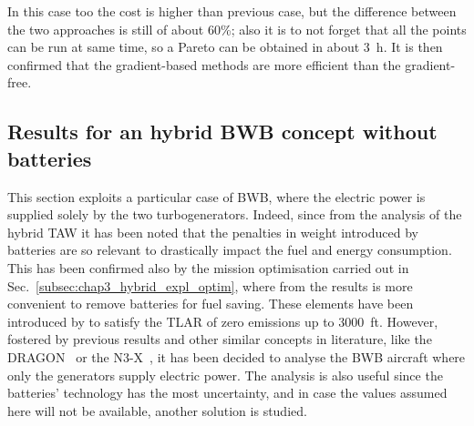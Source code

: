 In this case too the cost is higher than previous case, but the difference between the two approaches is still of about 60\%; also it is to not forget that all the points can be run at same time, so a Pareto can be obtained in about 3~\si{\hour}. 
It is then confirmed that the gradient-based methods are more efficient than the gradient-free. 

\subsection{Results for an hybrid BWB concept without batteries}
\label{subsec:chap4_bwb_hybrid_without_batteries}

This section exploits a particular case of BWB, where the electric power is supplied solely by the two turbogenerators. 
Indeed, since from the analysis of the hybrid TAW it has been noted that the penalties in weight introduced by batteries are so relevant to drastically impact the fuel and energy consumption.
This has been confirmed also by the mission optimisation carried out in Sec.~\ref{subsec:chap3_hybrid_expl_optim}, where from the results is more convenient to remove batteries for fuel saving. 
These elements have been introduced by to satisfy the TLAR of zero emissions up to 3000~ft.
However, fostered by previous results and other similar concepts in literature, like the DRAGON~\cite{bib:dragon} or the N3-X~\cite{bib:kim_n3x_2008}, it has been decided to analyse the BWB aircraft where only the generators supply electric power.
The analysis is also useful since the batteries' technology has the most uncertainty, and in case the values assumed here will not be available, another solution is studied. 

